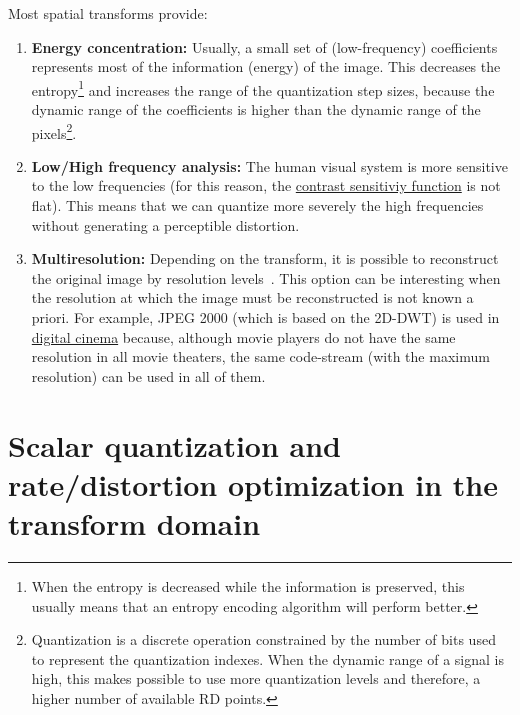 Most spatial transforms provide:
\begin{enumerate}
\item \textbf{Energy concentration:} Usually, a small set of
  (low-frequency) coefficients represents most of the information
  (energy) of the image. This decreases the entropy\footnote{When the
    entropy is decreased while the information is preserved, this
    usually means that an entropy encoding algorithm will perform
    better.} and increases the range of the quantization step sizes,
  because the dynamic range of the coefficients is higher than the
  dynamic range of the pixels\footnote{Quantization is a discrete
    operation constrained by the number of bits used to represent the
    quantization indexes. When the dynamic range of a signal is high,
    this makes possible to use more quantization levels and therefore,
    a higher number of available RD points.}.
\item \textbf{Low/High frequency analysis:} The human visual system is
  more sensitive to the low frequencies (for this reason, the
  \href{https://en.wikipedia.org/wiki/Contrast_(vision)#Contrast_sensitivity}{contrast
    sensitiviy function} is not flat). This means that we can quantize
  more severely the high frequencies without generating a perceptible
  distortion.
\item \textbf{Multiresolution:} Depending on the transform, it is
  possible to reconstruct the original image by resolution
  levels~\cite{vruiz__DWT}. This option can be interesting when the
  resolution at which the image must be reconstructed is not known a
  priori. For example, JPEG 2000 (which is based on the 2D-DWT) is
  used in \href{https://jpeg.org/jpeg2000/applications.html}{digital
    cinema} because, although movie players do not have the same
  resolution in all movie theaters, the same code-stream (with the
  maximum resolution) can be used in all of them.
\end{enumerate}


\section{Scalar quantization and rate/distortion optimization in the transform domain}

